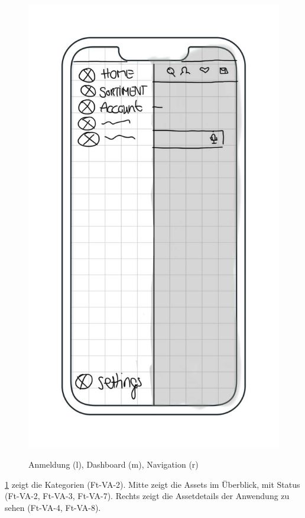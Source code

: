 \begin{figure}[h]
    \includegraphics[scale=0.37]{Bilder/Mockups/Navbar.jpg}
    \label{fig:m0}
\caption[Mockup: Anmeldung, Dashboard, Navigation]{Anmeldung (l), Dashboard (m), Navigation (r)}
\end{figure}


\ref{fig:m0} zeigt die Kategorien (Ft-VA-2). Mitte zeigt die Assets im Überblick, mit Status
(Ft-VA-2, Ft-VA-3, Ft-VA-7). Rechts zeigt die Assetdetails der Anwendung zu sehen (Ft-VA-4,
Ft-VA-8). 


